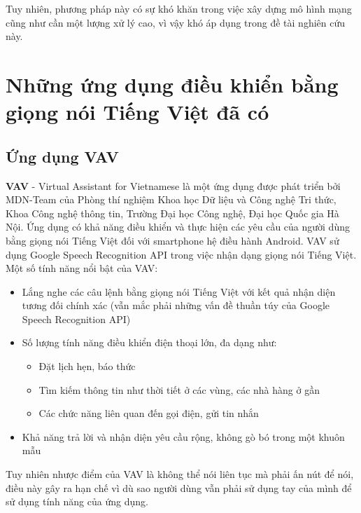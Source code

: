 \documentclass[12pt]{report}
\begin{document}
Tuy nhiên, phương pháp này có sự khó khăn trong việc xây dựng mô hình mạng cũng như cần một lượng xử lý cao, vì vậy khó áp dụng trong đề tài nghiên cứu này.
\section{Những ứng dụng điều khiển bằng giọng nói Tiếng Việt đã có}

\subsection{Ứng dụng VAV}

\textbf{VAV} - Virtual Assistant for Vietnamese là một ứng dụng được phát triển bởi MDN-Team của Phòng thí nghiệm Khoa học Dữ liệu và Công nghệ Tri thức, Khoa Công nghệ thông tin, Trường Đại học Công nghệ, Đại học Quốc gia Hà Nội. Ứng dụng có khả năng điều khiển và thực hiện các yêu cầu của người dùng bằng giọng nói Tiếng Việt đối với smartphone hệ điều hành Android. VAV sử dụng Google Speech Recognition API trong việc nhận dạng giọng nói Tiếng Việt. Một số tính năng nổi bật của VAV:

\begin{itemize}
	\item Lắng nghe các câu lệnh bằng giọng nói Tiếng Việt với kết quả nhận diện tương đối chính xác (vẫn mắc phải những vấn đề thuần túy của Google Speech Recognition API)
	\item Số lượng tính năng điều khiển điện thoại lớn, đa dạng như:
	\begin{itemize}
		\item Đặt lịch hẹn, báo thức
		\item Tìm kiếm thông tin như thời tiết ở các vùng, các nhà hàng ở gần
		\item Các chức năng liên quan đến gọi điện, gửi tin nhắn
	\end{itemize}
	\item Khả năng trả lời và nhận diện yêu cầu rộng, không gò bó trong một khuôn mẫu
\end{itemize}

Tuy nhiên nhược điểm của VAV là không thể nói liên tục mà phải ấn nút để nói, điều này gây ra hạn chế vì dù sao người dùng vẫn phải sử dụng tay của mình để sử dụng tính năng của ứng dụng.
\end{document}
